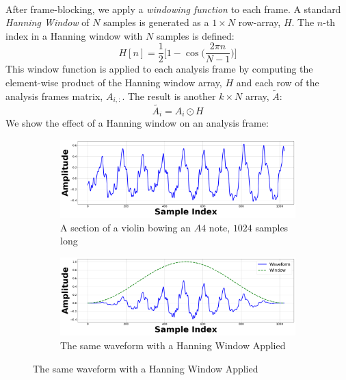\documentclass[12pt,letterpaper]{article}
\begin{document}
\paragraph*{}After frame-blocking, we apply a \textit{windowing function} to each frame. A standard \textit{Hanning Window} of $N$ samples is generated as a $1 \times N$ row-array, $H$. The $n$-th index in a Hanning window with $N$ samples is defined:
\begin{equation}
\label{eqn-Hanning}
H[n] = \frac{1}{2}\bigg[ 1 - \cos\Big( \frac{2\pi n}{N-1}\Big)\bigg]
\end{equation}
This window function is applied to each analysis frame by computing the element-wise product of the Hanning window array, $H$ and each row of the analysis frames matrix, $A_{i,:}$. The result is another $k \times N$ array, $\widetilde{A}$:
\begin{equation}
\label{eqn-WindowMatrix}
\widetilde{A_i} = A_i \odot H
\end{equation}
We show the effect of a Hanning window on an analysis frame:
\begin{figure}[H]

	\begin{subfigure}{1.0\textwidth}
	\centering
	\includegraphics[width=\textwidth , height=0.2\textheight]{../Figures/AnalysisFrame}
	\caption{A section of a violin bowing an $A4$ note, $1024$ samples long}
	\end{subfigure}	
	
	\begin{subfigure}{1.0\textwidth}
	\centering
	\includegraphics[width=\textwidth , height=0.2\textheight]{../Figures/WindowedFrame}
	\caption{The same waveform with a Hanning Window Applied}
	\end{subfigure}	

\end{figure}
\end{document}

